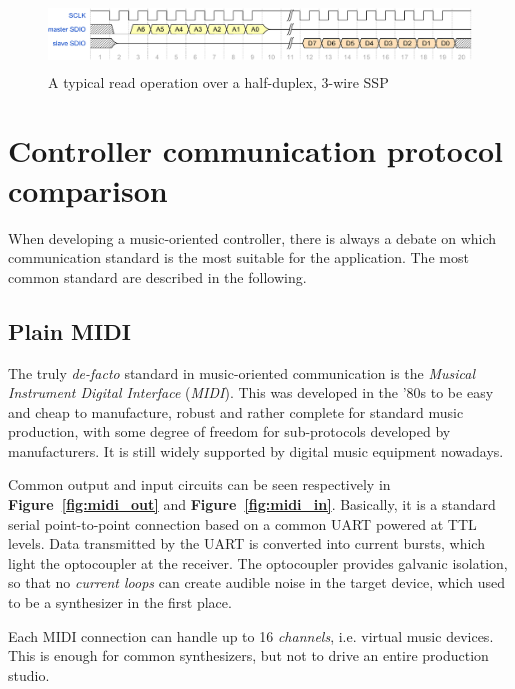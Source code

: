 \documentclass[a4paper,10pt]{article}
\newcommand{\citef}[1]{\textbf{Figure~\ref{#1}}}
\begin{document}
\begin{multicols}{2}
\begin{figure}[t]
	\centering
	\includegraphics[keepaspectratio=true,height=1.8cm]{images/ssp_read.pdf}
	\caption{A typical read operation over a half-duplex, 3-wire SSP}
	\label{fig:ssp_read}
\end{figure}


\section{Controller communication protocol comparison}
\label{sec:controller_protocols}

When developing a music-oriented controller, there is always a debate on which
communication standard is the most suitable for the application. The most
common standard are described in the following.


\subsection{Plain MIDI}

The truly \emph{de-facto} standard in music-oriented communication is the
\emph{Musical Instrument Digital Interface} (\emph{MIDI}). This was
developed in the '80s to be easy and cheap to manufacture, robust and rather
complete for standard music production, with some degree of freedom for
sub-protocols developed by manufacturers. It is still widely supported by
digital music equipment nowadays.

Common output and input circuits can be seen respectively in \citef{fig:midi_out}
and \citef{fig:midi_in}. Basically, it is a standard serial point-to-point
connection based on a common UART powered at TTL levels. Data transmitted by
the UART is converted into current bursts, which light the optocoupler at the
receiver. The optocoupler provides galvanic isolation, so that no
\emph{current loops} can create audible noise in the target device, which used
to be a synthesizer in the first place.

Each MIDI connection can handle up to 16 \emph{channels}, i.e. virtual music
devices. This is enough for common synthesizers, but not to drive an entire
production studio.


\end{multicols}
\end{document}
